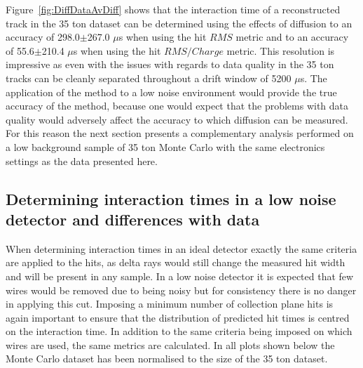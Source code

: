 Figure~\ref{fig:DiffDataAvDiff} shows that the interaction time of a reconstructed track in the 35 ton dataset can be determined using the effects of diffusion to an accuracy of 298.0$\pm$267.0 $\mu$s when using the hit $RMS$ metric and to an accuracy of 55.6$\pm$210.4 $\mu$s when using the hit $RMS/Charge$ metric. This resolution is impressive as even with the issues with regards to data quality in the 35 ton tracks can be cleanly separated throughout a drift window of 5200 $\mu$s. The application of the method to a low noise environment would provide the true accuracy of the method, because one would expect that the problems with data quality would adversely affect the accuracy to which diffusion can be measured. For this reason the next section presents a complementary analysis performed on a low background sample of 35 ton Monte Carlo with the same electronics settings as the data presented here. 

\subsection{Determining interaction times in a low noise detector and differences with data}
When determining interaction times in an ideal detector exactly the same criteria are applied to the hits, as delta rays would still change the measured hit width and will be present in any sample. In a low noise detector it is expected that few wires would be removed due to being noisy but for consistency there is no danger in applying this cut. Imposing a minimum number of collection plane hits is again important to ensure that the distribution of predicted hit times is centred on the interaction time. In addition to the same criteria being imposed on which wires are used, the same metrics are calculated. In all plots shown below the Monte Carlo dataset has been normalised to the size of the 35 ton dataset. \\

